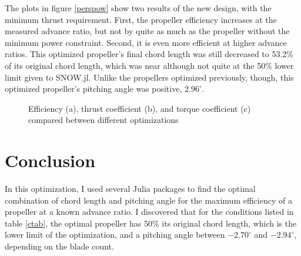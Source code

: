 \documentclass[journal ]{new-aiaa}
\newcounter{ctab}
\begin{document}
The plots in figure \eqref{perspow} show two results of the new design, with the minimum thrust requirement. First, the propeller efficiency increases at the measured advance ratio, but not by quite as much as the propeller without the minimum power constraint. Second, it is even more efficient at higher advance ratios. This optimized propeller's final chord length was still decreased to 53.2\% of its original chord length, which was near although not quite at the 50\% lower limit given to SNOW.jl. Unlike the propellers optimized previously, though, this optimized propeller's pitching angle was positive, $2.96^{\circ}$.

\begin{figure}[H]
\centering

	\hspace{1em}
	\caption{Efficiency (a), thrust coefficient (b), and torque coefficient (c) compared between different optimizations}
	\captionsetup{aboveskip=0pt,font=it}
	\label{perspow}
\end{figure}


\section{Conclusion}

In this optimization, I used several Julia packages to find the optimal combination of chord length and pitching angle for the maximum efficiency of a propeller at a known advance ratio. I discovered that for the conditions listed in table \eqref{ctab}, the optimal propeller has 50\% its original chord length, which is the lower limit of the optimization, and a pitching angle between $-2.70^{\circ}$ and $-2.94^{\circ}$, depending on the blade count.
\end{document}
